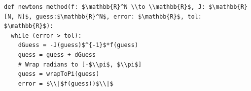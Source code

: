 \documentclass[border=10pt]{standalone}
\begin{document}
\begin{lstlisting}
def newtons_method(f: $\mathbb{R}^N \\to \\mathbb{R}$, J: $\mathbb{R}[N, N]$, guess:$\mathbb{R}^N$, error: $\mathbb{R}$, tol: $\mathbb{R}$):
  while (error > tol):
    dGuess = -J(guess)$^{-1}$*f(guess) 
    guess = guess + dGuess
    # Wrap radians to [-$\\pi$, $\\pi$]
    guess = wrapToPi(guess)
    error = $\\|$f(guess))$\\|$
\end{lstlisting}
\end{document}
